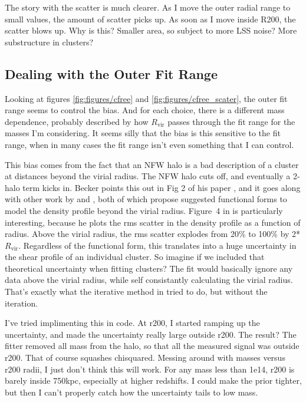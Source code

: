 \documentclass[11pt]{article}
\begin{document}
The story with the scatter is much clearer. As I move the outer radial range to small values, the amount of scatter picks up. As soon as I move inside R200, the scatter blows up. Why is this? Smaller area, so subject to more LSS noise? More substructure in clusters?


\subsection{Dealing with the Outer Fit Range}
\label{sec:outerfitrange}

Looking at figures \ref{fig:figures/cfree} and \ref{fig:figures/cfree_scater}, the outer fit range seems to control the bias. And for each choice, there is a different mass dependence, probably described by how $R_{\mathrm{vir}}$ passes through the fit range for the masses I'm considering. It seems silly that the bias is this sensitive to the fit range, when in many cases the fit range isn't even something that I can control.

This bias comes from the fact that an NFW halo is a bad description of a cluster at distances beyond the virial radius. The NFW halo cuts off, and eventually a 2-halo term kicks in. Becker points this out in Fig 2 of his paper \citep{becker11}, and it goes along with other work by \citet{oguri_profiles} and \citet{tavio_profiles}, both of which propose suggested functional forms to model the density profile beyond the virial radius. Figure~4 in \citet{tavio_profiles} is particularly interesting, because he plots the rms scatter in the density profile as a function of radius. Above the virial radius, the rms scatter explodes from 20\% to 100\% by 2*$R_{\mathrm{vir}}$. Regardless of the functional form, this translates into a huge uncertainty in the shear profile of an individual cluster. So imagine if we included that theoretical uncertainty when fitting clusters? The fit would basically ignore any data above the virial radius, while self consistantly calculating the virial radius. That's exactly what the iterative method in \citet{becker11} tried to do, but without the iteration.

I've tried implimenting this in code. At r200, I started ramping up the uncertainty, and made the uncertainty really large outside r200. The result? The fitter removed all mass from the halo, so that all the measured signal was outside r200. That of course squashes chisquared. Messing around with masses versus r200 radii, I just don't think this will work. For any mass less than 1e14, r200 is barely inside 750kpc, especially at higher redshifts. I could make the prior tighter, but then I can't properly catch how the uncertainty tails to low mass.
\end{document}
